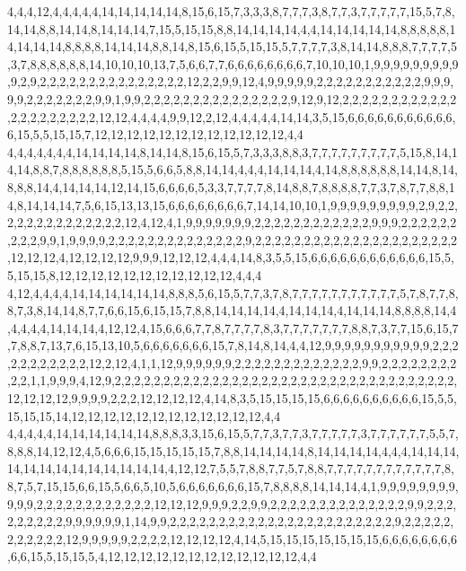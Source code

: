 4,4,4,12,4,4,4,4,4,14,14,14,14,14,8,15,6,15,7,3,3,3,8,7,7,7,3,8,7,7,3,7,7,7,7,7,15,5,7,8,14,14,8,8,14,14,8,14,14,14,7,15,5,15,15,8,8,14,14,14,14,4,4,14,14,14,14,14,8,8,8,8,8,14,14,14,14,8,8,8,8,14,14,14,8,8,14,8,15,6,15,5,15,15,5,7,7,7,7,3,8,14,14,8,8,8,7,7,7,7,5,3,7,8,8,8,8,8,8,14,10,10,10,13,7,5,6,6,7,7,6,6,6,6,6,6,6,6,7,10,10,10,1,9,9,9,9,9,9,9,9,9,9,2,9,2,2,2,2,2,2,2,2,2,2,2,2,2,2,2,12,2,2,9,9,12,4,9,9,9,9,9,2,2,2,2,2,2,2,2,2,2,2,9,9,9,9,9,2,2,2,2,2,2,2,9,9,1,9,9,2,2,2,2,2,2,2,2,2,2,2,2,2,2,2,9,12,9,12,2,2,2,2,2,2,2,2,2,2,2,2,2,2,2,2,2,2,2,2,2,12,12,4,4,4,4,9,9,12,2,12,4,4,4,4,4,14,14,3,5,15,6,6,6,6,6,6,6,6,6,6,6,6,15,5,5,15,15,7,12,12,12,12,12,12,12,12,12,12,12,12,4,4
4,4,4,4,4,4,4,14,14,14,14,8,14,14,8,15,6,15,5,7,3,3,3,8,8,3,7,7,7,7,7,7,7,7,7,5,15,8,14,14,14,8,8,7,8,8,8,8,8,8,5,15,5,6,6,5,8,8,14,14,4,4,4,14,14,14,4,14,8,8,8,8,8,8,14,14,8,14,8,8,8,14,4,14,14,14,12,14,15,6,6,6,6,5,3,3,7,7,7,7,8,14,8,8,7,8,8,8,8,7,7,3,7,8,7,7,8,8,14,8,14,14,14,7,5,6,15,13,13,15,6,6,6,6,6,6,6,6,7,14,14,10,10,1,9,9,9,9,9,9,9,9,9,2,9,2,2,2,2,2,2,2,2,2,2,2,2,2,2,12,4,12,4,1,9,9,9,9,9,9,9,2,2,2,2,2,2,2,2,2,2,2,2,9,9,9,2,2,2,2,2,2,2,2,2,9,9,1,9,9,9,9,2,2,2,2,2,2,2,2,2,2,2,2,2,2,9,2,2,2,2,2,2,2,2,2,2,2,2,2,2,2,2,2,2,2,2,2,12,12,12,4,12,12,12,12,9,9,9,12,12,12,4,4,4,14,8,3,5,5,15,6,6,6,6,6,6,6,6,6,6,6,6,15,5,5,15,15,8,12,12,12,12,12,12,12,12,12,12,12,4,4,4
4,12,4,4,4,4,14,14,14,14,14,14,8,8,8,5,6,15,5,7,7,3,7,8,7,7,7,7,7,7,7,7,7,7,7,5,7,8,7,7,8,8,7,3,8,14,14,8,7,7,6,6,15,6,15,15,7,8,8,14,14,14,14,4,14,14,14,4,14,14,14,8,8,8,8,14,4,4,4,4,4,14,14,14,4,12,12,4,15,6,6,6,7,7,8,7,7,7,7,8,3,7,7,7,7,7,7,7,8,8,7,3,7,7,15,6,15,7,7,8,8,7,13,7,6,15,13,10,5,6,6,6,6,6,6,6,15,7,8,14,8,14,4,4,12,9,9,9,9,9,9,9,9,9,9,9,2,2,2,2,2,2,2,2,2,2,2,12,2,12,4,1,1,12,9,9,9,9,9,9,2,2,2,2,2,2,2,2,2,2,2,2,2,9,9,2,2,2,2,2,2,2,2,2,2,1,1,9,9,9,4,12,9,2,2,2,2,2,2,2,2,2,2,2,2,2,2,2,2,2,2,2,2,2,2,2,2,2,2,2,2,2,2,2,2,2,2,2,12,12,12,12,9,9,9,9,2,2,2,12,12,12,12,4,14,8,3,5,15,15,15,15,6,6,6,6,6,6,6,6,6,6,15,5,5,15,15,15,14,12,12,12,12,12,12,12,12,12,12,12,12,4,4
4,4,4,4,4,14,14,14,14,14,14,8,8,8,3,3,15,6,15,5,7,7,3,7,7,3,7,7,7,7,7,3,7,7,7,7,7,7,5,5,7,8,8,8,14,12,12,4,5,6,6,6,15,15,15,15,15,7,8,8,14,14,14,14,8,14,14,14,14,4,4,4,14,14,14,14,14,14,14,14,14,14,14,14,14,4,12,12,7,5,5,7,8,8,7,7,5,7,8,8,7,7,7,7,7,7,7,7,7,7,7,7,8,8,7,5,7,15,15,6,6,15,5,6,6,5,10,5,6,6,6,6,6,6,6,15,7,8,8,8,8,14,14,14,4,1,9,9,9,9,9,9,9,9,9,9,9,2,2,2,2,2,2,2,2,2,2,2,2,12,12,12,9,9,9,2,2,9,9,2,2,2,2,2,2,2,2,2,2,2,2,2,2,9,9,2,2,2,2,2,2,2,2,2,9,9,9,9,9,9,1,14,9,9,2,2,2,2,2,2,2,2,2,2,2,2,2,2,2,2,2,2,2,2,2,2,2,9,2,2,2,2,2,2,2,2,2,2,2,12,9,9,9,9,9,2,2,2,2,12,12,12,12,4,14,5,15,15,15,15,15,15,15,6,6,6,6,6,6,6,6,6,6,15,5,15,15,5,4,12,12,12,12,12,12,12,12,12,12,12,12,4,4
